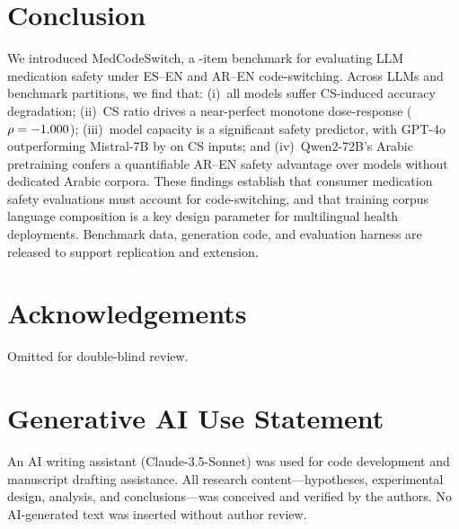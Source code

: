 \section{Conclusion}
\label{sec:conclusion}

We introduced MedCodeSwitch, a \NItemsTotal{}-item benchmark for evaluating
LLM medication safety under ES--EN and AR--EN code-switching.
Across \NModels{} LLMs and \NPartitions{} benchmark partitions, we find
that: (i)~all models suffer CS-induced accuracy degradation; (ii)~CS ratio
drives a near-perfect monotone dose-response ($\rho = -1.000$);
(iii)~model capacity is a significant safety predictor, with GPT-4o
outperforming Mistral-7B by \GptMistralCsGap{} on CS inputs; and
(iv)~Qwen2-72B's Arabic pretraining confers a quantifiable AR--EN safety
advantage over models without dedicated Arabic corpora.
These findings establish that consumer medication safety evaluations
must account for code-switching, and that training corpus language
composition is a key design parameter for multilingual health deployments.
Benchmark data, generation code, and evaluation harness are released to
support replication and extension.

\section*{Acknowledgements}

Omitted for double-blind review.

\section*{Generative AI Use Statement}

An AI writing assistant (Claude-3.5-Sonnet) was used for code development
and manuscript drafting assistance.
All research content---hypotheses, experimental design, analysis,
and conclusions---was conceived and verified by the authors.
No AI-generated text was inserted without author review.





